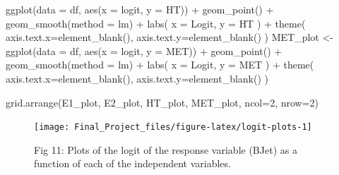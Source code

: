 \documentclass[
]{article}
\newenvironment{Shaded}{\begin{snugshade}}{\end{snugshade}}
\newcommand{\AttributeTok}[1]{\textcolor[rgb]{0.77,0.63,0.00}{#1}}
\newcommand{\DecValTok}[1]{\textcolor[rgb]{0.00,0.00,0.81}{#1}}
\newcommand{\FunctionTok}[1]{\textcolor[rgb]{0.00,0.00,0.00}{#1}}
\newcommand{\NormalTok}[1]{#1}
\newcommand{\OtherTok}[1]{\textcolor[rgb]{0.56,0.35,0.01}{#1}}
\newcommand{\SpecialCharTok}[1]{\textcolor[rgb]{0.00,0.00,0.00}{#1}}
\newcommand{\StringTok}[1]{\textcolor[rgb]{0.31,0.60,0.02}{#1}}
\begin{document}
\begin{Shaded}
\begin{Highlighting}[]
  \FunctionTok{ggplot}\NormalTok{(}\AttributeTok{data =}\NormalTok{ df, }\FunctionTok{aes}\NormalTok{(}\AttributeTok{x =}\NormalTok{ logit, }\AttributeTok{y =}\NormalTok{ HT)) }\SpecialCharTok{+} 
    \FunctionTok{geom\_point}\NormalTok{() }\SpecialCharTok{+}
      \FunctionTok{geom\_smooth}\NormalTok{(}\AttributeTok{method =} \StringTok{\textquotesingle{}lm\textquotesingle{}}\NormalTok{) }\SpecialCharTok{+} 
        \FunctionTok{labs}\NormalTok{(}
          \AttributeTok{x =} \StringTok{\textquotesingle{}Logit\textquotesingle{}}\NormalTok{,}
          \AttributeTok{y =} \StringTok{\textquotesingle{}HT\textquotesingle{}}
\NormalTok{        ) }\SpecialCharTok{+} 
          \FunctionTok{theme}\NormalTok{(}
            \AttributeTok{axis.text.x=}\FunctionTok{element\_blank}\NormalTok{(),}
            \AttributeTok{axis.text.y=}\FunctionTok{element\_blank}\NormalTok{()}
\NormalTok{          )}
\NormalTok{MET\_plot }\OtherTok{\textless{}{-}}
  \FunctionTok{ggplot}\NormalTok{(}\AttributeTok{data =}\NormalTok{ df, }\FunctionTok{aes}\NormalTok{(}\AttributeTok{x =}\NormalTok{ logit, }\AttributeTok{y =}\NormalTok{ MET)) }\SpecialCharTok{+} 
    \FunctionTok{geom\_point}\NormalTok{() }\SpecialCharTok{+}
      \FunctionTok{geom\_smooth}\NormalTok{(}\AttributeTok{method =} \StringTok{\textquotesingle{}lm\textquotesingle{}}\NormalTok{) }\SpecialCharTok{+} 
        \FunctionTok{labs}\NormalTok{(}
          \AttributeTok{x =} \StringTok{\textquotesingle{}Logit\textquotesingle{}}\NormalTok{,}
          \AttributeTok{y =} \StringTok{\textquotesingle{}MET\textquotesingle{}}
\NormalTok{        ) }\SpecialCharTok{+} 
          \FunctionTok{theme}\NormalTok{(}
            \AttributeTok{axis.text.x=}\FunctionTok{element\_blank}\NormalTok{(),}
            \AttributeTok{axis.text.y=}\FunctionTok{element\_blank}\NormalTok{()}
\NormalTok{          )}

\FunctionTok{grid.arrange}\NormalTok{(E1\_plot, E2\_plot, HT\_plot, MET\_plot, }\AttributeTok{ncol=}\DecValTok{2}\NormalTok{, }\AttributeTok{nrow=}\DecValTok{2}\NormalTok{)}
\end{Highlighting}
\end{Shaded}

\begin{figure}

{\centering \texttt{[image: Final\_Project\_files/figure-latex/logit-plots-1]} 

}

\caption{Fig 11: Plots of the logit of the response variable (BJet) as a function of each of the independent variables.}\label{fig:logit-plots}
\end{figure}
\end{document}
